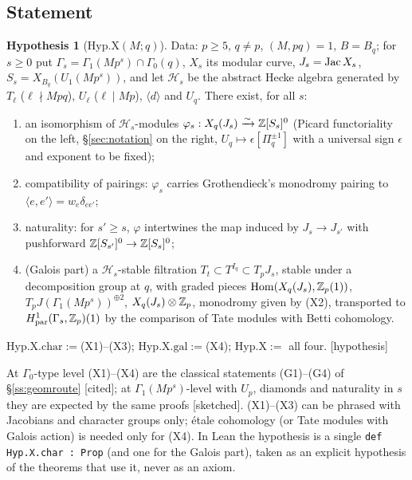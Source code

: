 \documentclass[11pt]{amsart}
\theoremstyle{plain}
\theoremstyle{definition}
\newtheorem{hypothesis}[theorem]{Hypothesis}
\theoremstyle{remark}
\newcommand{\status}[1]{\textup{\textsf{[#1]}}}
\newcommand{\stcited}{\status{cited}}
\newcommand{\stsketch}{\status{sketched}}
\newcommand{\sthyp}{\status{hypothesis}}
\DeclareMathOperator{\Hom}{Hom}\DeclareMathOperator{\coker}{coker}\DeclareMathOperator{\End}{End}
\begin{document}
\subsection{Statement}
\begin{hypothesis}[$\mathrm{Hyp.X}(M;q)$]\label{hyp:X}
Data: $p\ge5$, $q\ne p$, $(M,pq)=1$, $B=B_q$; for $s\ge0$ put $\Gamma_s=\Gamma_1(Mp^s)\cap\Gamma_0(q)$, $X_s$ its modular curve, $J_s=\operatorname{Jac} X_s$, $S_s=X_{B_q}(U_1(Mp^s))$, and let $\mathcal H_s$ be the abstract Hecke algebra generated by $T_\ell$ ($\ell\nmid Mpq$), $U_\ell$ ($\ell\mid Mp$), $\langle d\rangle$ and $U_q$. There exist, for all $s$:
\begin{enumerate}[label=(X\arabic*)]
\item an isomorphism of $\mathcal H_s$-modules $\varphi_s:X_q(J_s)\xrightarrow{\sim}\mathbb{Z}[S_s]^0$ (Picard functoriality on the left, \S\ref{sec:notation} on the right, $U_q\mapsto\epsilon[\Pi_q^{\pm1}]$ with a universal sign $\epsilon$ and exponent to be fixed);
\item compatibility of pairings: $\varphi_s$ carries Grothendieck's monodromy pairing to $\langle e,e'\rangle=w_e\delta_{ee'}$;
\item naturality: for $s'\ge s$, $\varphi$ intertwines the map induced by $J_s\to J_{s'}$ with pushforward $\mathbb{Z}[S_{s'}]^0\to\mathbb{Z}[S_s]^0$;
\item (Galois part) a $\mathcal H_s$-stable filtration $T_t\subset T^{I_q}\subset T_pJ_s$, stable under a decomposition group at $q$, with graded pieces $\Hom(X_q(J_s),\Z_p(1))$, $T_pJ(\Gamma_1(Mp^s))^{\oplus2}$, $X_q(J_s)\otimes\mathbb{Z}_p$, monodromy given by (X2), transported to $H^1_{\rm par}(\Gamma_s,\mathbb{Z}_p)(1)$ by the comparison of Tate modules with Betti cohomology.
\end{enumerate}
$\mathrm{Hyp.X.char}:=$(X1)--(X3); $\mathrm{Hyp.X.gal}:=$(X4); $\mathrm{Hyp.X}:=$ all four. \sthyp
\end{hypothesis}
At $\Gamma_0$-type level (X1)--(X4) are the classical statements (G1)--(G4) of \S\ref{ss:geomroute} \stcited; at $\Gamma_1(Mp^s)$-level with $U_p$, diamonds and naturality in $s$ they are expected by the same proofs \stsketch. (X1)--(X3) can be phrased with Jacobians and character groups only; étale cohomology (or Tate modules with Galois action) is needed only for (X4).
In Lean the hypothesis is a single \texttt{def Hyp.X.char : Prop} (and one for the Galois part), taken as an explicit hypothesis of the theorems that use it, never as an axiom.
\end{document}
